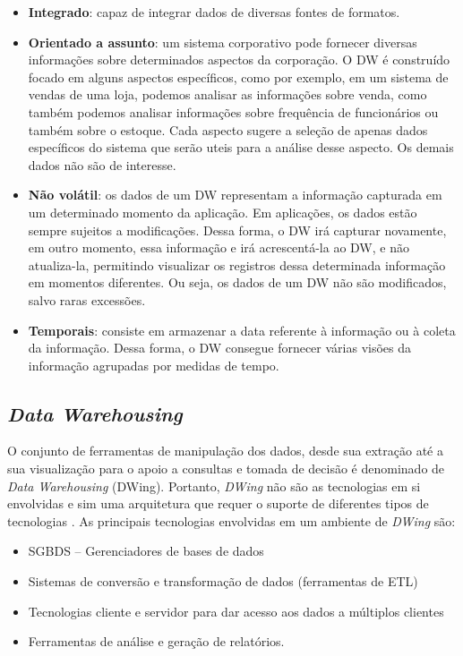 \begin{itemize}

\item \textbf{Integrado}:
%
capaz de integrar dados de diversas fontes de formatos.

\item \textbf{Orientado a assunto}:
%
um sistema corporativo pode fornecer diversas informações sobre determinados aspectos da corporação.
%
O DW é construído focado em alguns aspectos específicos, como por exemplo, em um sistema de vendas de uma loja, podemos analisar as informações sobre venda, como também podemos analisar informações sobre frequência de funcionários ou também sobre o estoque.
%
Cada aspecto sugere a seleção de apenas dados específicos do sistema que serão uteis para a análise desse aspecto. Os demais dados não são de interesse.

\item \textbf{Não volátil}:
%
os dados de um DW representam a informação capturada em um determinado momento da aplicação.
%
Em aplicações, os dados estão sempre sujeitos a modificações.
%
Dessa forma, o DW irá capturar novamente, em outro momento, essa informação e irá acrescentá-la ao DW, e não atualiza-la, permitindo visualizar os registros dessa determinada informação em momentos diferentes.
%
Ou seja, os dados de um DW não são modificados, salvo raras excessões.

\item \textbf{Temporais}:
%
consiste em armazenar a data referente à informação ou à coleta da informação. Dessa forma, o DW consegue fornecer várias visões da informação agrupadas por medidas de tempo. 

\end{itemize}

\subsection{\emph{Data Warehousing}}

O conjunto de ferramentas de manipulação dos dados, desde sua extração até a sua visualização para o apoio a consultas e tomada de decisão é denominado de \emph{Data Warehousing} (DWing). Portanto,  \emph{DWing} não são as tecnologias em si envolvidas e sim uma arquitetura que requer o suporte de diferentes tipos de tecnologias \cite{inmon2002}.  As principais tecnologias envolvidas em um ambiente de \emph{DWing} são:


\begin{itemize}
\item SGBDS – Gerenciadores de bases de dados
\item Sistemas de conversão e transformação de dados (ferramentas de ETL)
\item Tecnologias cliente e servidor para dar acesso aos dados a múltiplos clientes
\item Ferramentas de análise e geração de relatórios.
\end{itemize}

